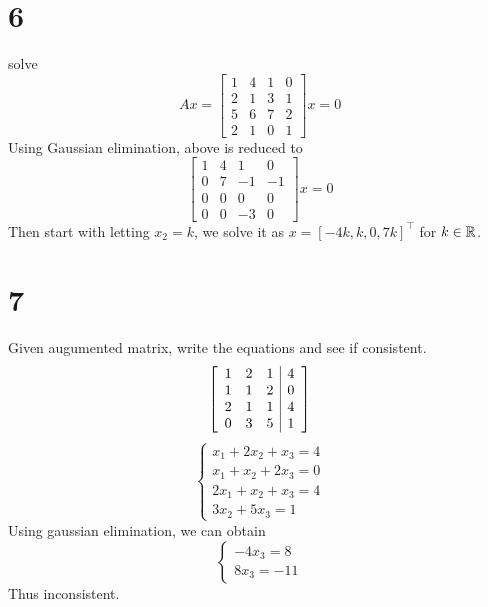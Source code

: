 \documentclass{article}
\begin{document}
\section*{6}
\begin{myleftlinebox}
    solve \[Ax = \begin{bmatrix}
        1 & 4 & 1 & 0 \\
        2 & 1 & 3 & 1 \\
        5 & 6 & 7 & 2\\
        2 & 1 & 0 & 1
    \end{bmatrix}x=0\]
    \tcblower
    Using Gaussian elimination, above is reduced to \[\begin{bmatrix}
        1 & 4 & 1 & 0 \\
        0 & 7 & -1 & -1\\
        0 & 0 & 0& 0\\
        0 & 0 & -3 & 0
    \end{bmatrix}x=0\]
    Then start with letting \(x_2 = k\), we solve it as \(x = [-4k,k,0,7k]^\top\) for \(k\in\mathbb{R}\).
\end{myleftlinebox}

\section*{7}
\begin{myleftlinebox}
    Given augumented matrix, write the equations and see if consistent.
    \[
        \SB{
            \begin{array}[]{ccc|c}
                1 & 2 & 1 & 4\\
                1 & 1 & 2 & 0\\
                2 & 1 & 1 & 4\\
                0 & 3&  5 & 1
            \end{array}
        }
    \]
    \tcblower
    \[
        \begin{cases}
            x_1+2x_2+x_3 = 4\\
            x_1 + x_2 + 2x_3=0\\
            2x_1 + x_2 + x_3=4\\
            3x_2 + 5x_3 = 1
        \end{cases}
    \]
    Using gaussian elimination, we can obtain
    \[\begin{cases}
        -4x_3 = 8\\
        8x_3 = -11
    \end{cases}\]
    Thus inconsistent.
\end{myleftlinebox}




%
%

\end{document}
